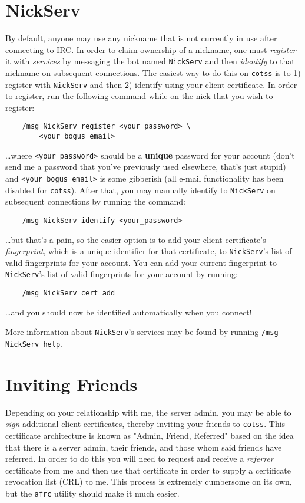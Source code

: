 \documentclass{article}
\begin{document}
{\section{NickServ}
By default, anyone may use any nickname that is not currently in use after connecting to IRC.  In order to claim ownership of a nickname, one must \textit{register} it with \textit{services} by messaging the bot named \texttt{NickServ} and then \textit{identify} to that nickname on subsequent connections.  The easiest way to do this on \texttt{cotss} is to 1) register with \texttt{NickServ} and then 2) identify using your client certificate.  In order to register, run the following command while on the nick that you wish to register:
\begin{lstlisting}
    /msg NickServ register <your_password> \
        <your_bogus_email>
\end{lstlisting}
\ldots where \texttt{<your\_password>} should be a \textbf{unique} password for your account (don't send me a password that you've previously used elsewhere, that's just stupid) and \texttt{<your\_bogus\_email>} is some gibberish (all e-mail functionality has been disabled for \texttt{cotss}).  After that, you may manually identify to \texttt{NickServ} on subsequent connections by running the command:
\begin{lstlisting}
    /msg NickServ identify <your_password>
\end{lstlisting}
\ldots but that's a pain, so the easier option is to add your client certificate's \textit{fingerprint}, which is a unique identifier for that certificate, to \texttt{NickServ}'s list of valid fingerprints for your account.  You can add your current fingerprint to \texttt{NickServ}'s list of valid fingerprints for your account by running:
\begin{lstlisting}
	/msg NickServ cert add
\end{lstlisting}
\ldots and you should now be identified automatically when you connect!

More information about \texttt{NickServ}'s services may be found by running \texttt{/msg NickServ help}.

\section{Inviting Friends}
Depending on your relationship with me, the server admin, you may be able to \emph{sign} additional client certificates, thereby inviting your friends to \texttt{cotss}.  This certificate architecture is known as "Admin, Friend, Referred" based on the idea that there is a server admin, their friends, and those whom said friends have referred.  In order to do this you will need to request and receive a \emph{referrer} certificate from me and then use that certificate in order to supply a certificate revocation list (CRL) to me.  This process is extremely cumbersome on its own, but the \texttt{afrc} utility should make it much easier.

}
\end{document}
